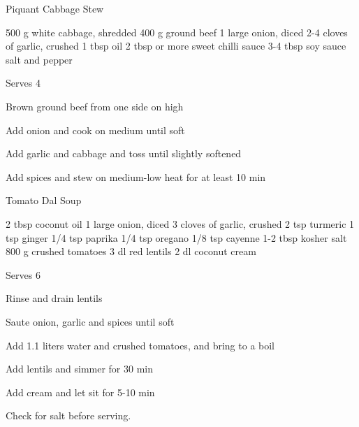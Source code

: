     
\begin{recipe}{Piquant Cabbage Stew}{}
\begin{ingredients}
500 g white cabbage, shredded
400 g ground beef
1 large onion, diced
2-4	cloves of garlic, crushed
1 tbsp oil 
2 tbsp or more sweet chilli sauce
3-4 tbsp soy sauce
salt and pepper
\end{ingredients}
\nextcolumn
Serves 4
\begin{steps}
    \item Brown ground beef from one side on high
    \item Add onion and cook on medium until soft
    \item Add garlic and cabbage and toss until slightly softened
    \item Add spices and stew on medium-low heat for at least 10 min
\end{steps}
\end{recipe}

\begin{denserecipe}{Tomato Dal Soup}{\vegetarian{}}
\begin{ingredients}
2 tbsp coconut oil
1 large onion, diced
3 cloves of garlic, crushed
2 tsp turmeric
1 tsp ginger
1/4 tsp paprika
1/4 tsp oregano
1/8 tsp cayenne
1-2 tbsp kosher salt
800 g crushed tomatoes
3 dl red lentils 
2 dl coconut cream
\end{ingredients}
\nextcolumn
Serves 6
\begin{steps}
    \item Rinse and drain lentils
    \item Saute onion, garlic and spices until soft
    \item Add 1.1 liters water and crushed tomatoes, and bring to a boil
    \item Add lentils and simmer for 30 min
    \item Add cream and let sit for 5-10 min
\end{steps}
Check for salt before serving.
\end{denserecipe}

